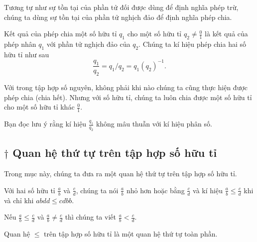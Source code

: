 Tương tự như sự tồn tại của phần tử đối được dùng để định nghĩa phép trừ, chúng ta dùng sự tồn tại của phần tử nghịch đảo để định nghĩa phép chia.
\begin{definition}
	Kết quả của phép chia một số hữu tỉ $q_{1}$ cho một số hữu tỉ $q_{2}\ne\frac{0}{1}$ là kết quả của phép nhân $q_{1}$ với phần tử nghịch đảo của $q_{2}$. Chúng ta kí hiệu phép chia hai số hữu tỉ như sau
	\[
		\frac{q_{1}}{q_{2}} = q_{1}/q_{2} = q_{1}{(q_{2})}^{-1}.
	\]
\end{definition}

Với trong tập hợp số nguyên, không phải khi nào chúng ta cũng thực hiện được phép chia (chia hết). Nhưng với số hữu tỉ, chúng ta luôn chia được một số hữu tỉ cho một số hữu tỉ khác $\frac{0}{1}$.

Bạn đọc lưu ý rằng kí hiệu $\frac{q_{1}}{q_{2}}$ không mâu thuẫn với kí hiệu phân số.

\subsection{$\dagger$ Quan hệ thứ tự trên tập hợp số hữu tỉ}

Trong mục này, chúng ta đưa ra một quan hệ thứ tự trên tập hợp số hữu tỉ.
\begin{definition}
	Với hai số hữu tỉ $\frac{a}{b}$ và $\frac{c}{d}$, chúng ta nói $\frac{a}{b}$ nhỏ hơn hoặc bằng $\frac{c}{d}$ và kí hiệu $\frac{a}{b}\leq \frac{c}{d}$ khi và chỉ khi $abdd \leq cdbb$.

	Nếu $\frac{a}{b}\leq \frac{c}{d}$ và $\frac{a}{b}\ne\frac{c}{d}$ thì chúng ta viết $\frac{a}{b} < \frac{c}{d}$.
\end{definition}

\begin{theorem}
	Quan hệ $\leq$ trên tập hợp số hữu tỉ là một quan hệ thứ tự toàn phần.
\end{theorem}

